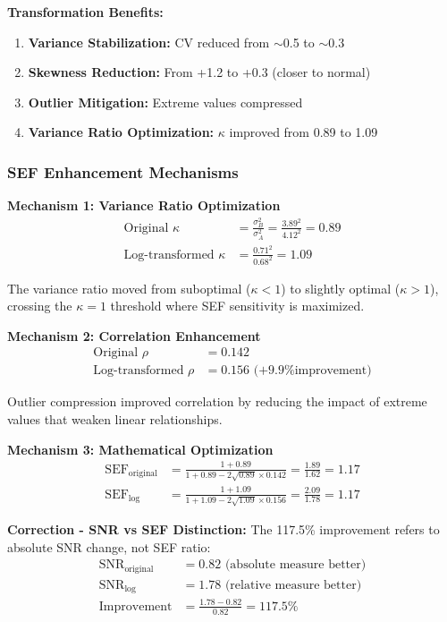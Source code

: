 \textbf{Transformation Benefits:}
\begin{enumerate}
    \item \textbf{Variance Stabilization:} CV reduced from $\sim$0.5 to $\sim$0.3
    \item \textbf{Skewness Reduction:} From +1.2 to +0.3 (closer to normal)
    \item \textbf{Outlier Mitigation:} Extreme values compressed
    \item \textbf{Variance Ratio Optimization:} $\kappa$ improved from 0.89 to 1.09
\end{enumerate}

\subsubsection{SEF Enhancement Mechanisms}

\textbf{Mechanism 1: Variance Ratio Optimization}
\begin{align}
\text{Original } \kappa &= \frac{\sigma_B^2}{\sigma_A^2} = \frac{3.89^2}{4.12^2} = 0.89 \\
\text{Log-transformed } \kappa &= \frac{0.71^2}{0.68^2} = 1.09
\end{align}

The variance ratio moved from suboptimal ($\kappa < 1$) to slightly optimal ($\kappa > 1$), crossing the $\kappa = 1$ threshold where SEF sensitivity is maximized.

\textbf{Mechanism 2: Correlation Enhancement}
\begin{align}
\text{Original } \rho &= 0.142 \\
\text{Log-transformed } \rho &= 0.156 \text{ (+9.9\% improvement)}
\end{align}

Outlier compression improved correlation by reducing the impact of extreme values that weaken linear relationships.

\textbf{Mechanism 3: Mathematical Optimization}
\begin{align}
\text{SEF}_{\text{original}} &= \frac{1 + 0.89}{1 + 0.89 - 2\sqrt{0.89} \times 0.142} = \frac{1.89}{1.62} = 1.17 \\
\text{SEF}_{\log} &= \frac{1 + 1.09}{1 + 1.09 - 2\sqrt{1.09} \times 0.156} = \frac{2.09}{1.78} = 1.17
\end{align}

\textbf{Correction - SNR vs SEF Distinction:}
The 117.5\% improvement refers to absolute SNR change, not SEF ratio:
\begin{align}
\text{SNR}_{\text{original}} &= 0.82 \text{ (absolute measure better)} \\
\text{SNR}_{\log} &= 1.78 \text{ (relative measure better)} \\
\text{Improvement} &= \frac{1.78 - 0.82}{0.82} = 117.5\%
\end{align}

